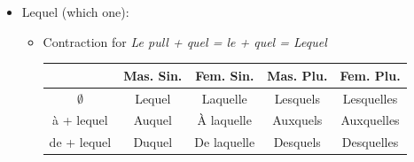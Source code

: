 \documentclass{book}
\begin{document}
\begin{itemize}
\begin{itemize}
                    \item Case for follow up question, quel + noun:
                        \begin{center}
                            Qu'est-ce que tu penses de mon idée? \\
                            \textcolor{red}{Quelle} idée? \\
                        \end{center}
                \end{itemize}

            \item Lequel (which one):
                \begin{itemize}
                    \item Contraction for \textit{Le pull + quel = le + quel = Lequel}
                    \begin{center}
                        \begin{tabular}{|c|c|c|c|c|}
                            \hline
                            & \textbf{Mas. Sin.} & \textbf{Fem. Sin.} & \textbf{Mas. Plu.} & \textbf{Fem. Plu.}\\
                            \hline
                            $\emptyset$ & Lequel & Laquelle & Lesquels & Lesquelles \\
                            \hline
                            à + lequel & Auquel & À laquelle & Auxquels & Auxquelles \\
                            \hline
                            de + lequel & Duquel & De laquelle & Desquels & Desquelles \\
                            \hline
                        \end{tabular}
                    \end{center}
                \end{itemize}
        \end{itemize}
\end{document}
